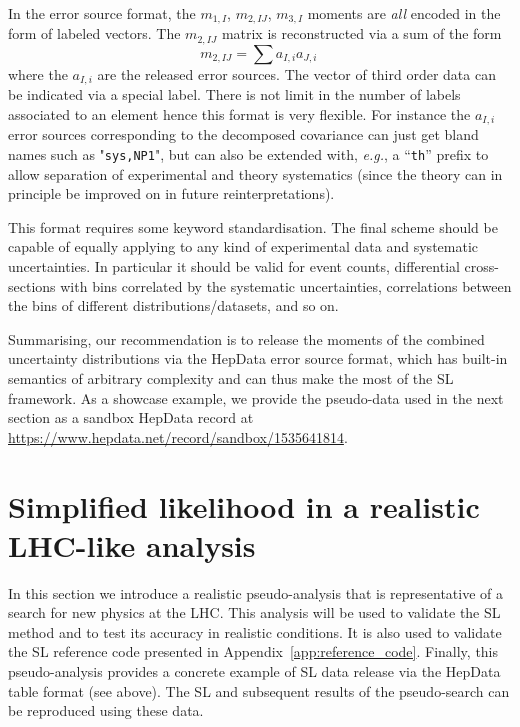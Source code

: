 \documentclass[11pt]{article}
\def\eg{{\it e.g.}}
\newcommand{\be}{\begin{equation}}
\newcommand{\ee}{\end{equation}}
\begin{document}
In the error source format, the $m_{1,I}$, $m_{2,IJ}$, $m_{3,I}$ moments are
\textit{all} encoded in the form of labeled vectors. The $m_{2,IJ}$ matrix is
reconstructed via a sum of the form \be m_{2,IJ}= \sum {a_{I,i}a_{J,i}} \, 
\label{eq:sum_errsource}
\ee
where the $a_{I,i}$ are the released error sources.
The vector of third order data can be  indicated via a special label.
There is not limit in the number of labels associated to an element hence this format is very flexible.
For instance the $a_{I,i}$ error sources corresponding to the decomposed covariance  can just get bland names such as "{\tt sys,NP1}", but  can also be extended with, \eg, a ``{\tt th}'' prefix to allow separation of experimental and theory systematics (since the theory can in principle be improved on in future reinterpretations).


This format requires some keyword standardisation.  The final scheme should
be capable of equally applying to any kind of experimental data and systematic uncertainties. In particular it should be valid for event counts,  differential cross-sections with bins correlated by the systematic uncertainties, correlations between  the bins of different distributions/datasets, and so on.


Summarising, our recommendation is to release the moments of the combined uncertainty distributions via the HepData error source format, which has built-in semantics of arbitrary complexity and can thus make the most of the SL framework. As a showcase example, we provide the pseudo-data used in the next section as a sandbox HepData record at \url{https://www.hepdata.net/record/sandbox/1535641814}.








\section{Simplified likelihood in a  realistic LHC-like analysis }
\label{se:SL_LHC}

In this section we introduce a realistic pseudo-analysis that is representative of a search for new physics at the LHC. 
This analysis will be used to validate the SL method and to test its accuracy in realistic conditions. 
It is also used to validate the SL reference code presented in Appendix~\ref{app:reference_code}. 
Finally, this pseudo-analysis provides a concrete example of SL data release via the HepData table format (see above). 
The SL and subsequent results of the pseudo-search can be reproduced using these data. 
\end{document}
